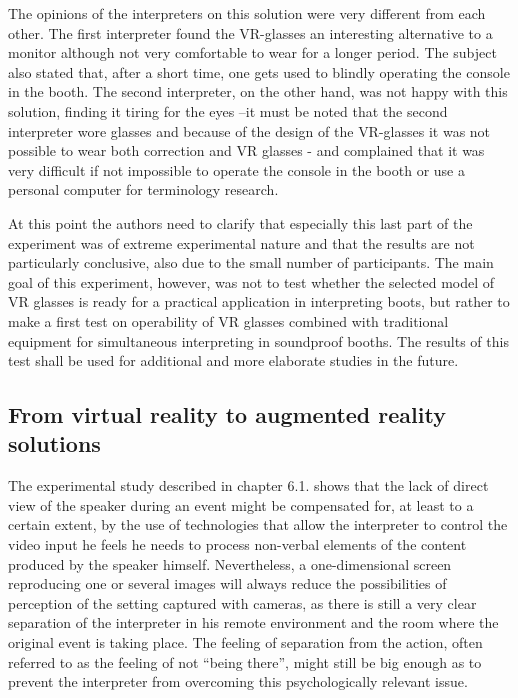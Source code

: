 \documentclass[output=paper]{langsci/langscibook}
\begin{document}
The opinions of the interpreters on this solution were very different from each other. The first interpreter found the \textsc{VR}-glasses an interesting alternative to a monitor although not very comfortable to wear for a longer period. The subject also stated that, after a short time, one gets used to blindly operating the console in the booth. The second interpreter, on the other hand, was not happy with this solution, finding it tiring for the eyes –it must be noted that the second interpreter wore glasses and because of the design of the \textsc{VR}-glasses it was not possible to wear both correction and \textsc{VR} glasses - and complained that it was very difficult if not impossible to operate the console in the booth or use a personal computer for terminology research.

At this point the authors need to clarify that especially this last part of the experiment was of extreme experimental nature and that the results are not particularly conclusive, also due to the small number of participants. The main goal of this experiment, however, was not to test whether the selected model of \textsc{VR} glasses is ready for a practical application in interpreting boots, but rather to make a first test on operability of \textsc{VR} glasses combined with traditional equipment for simultaneous interpreting in soundproof booths. The results of this test shall be used for additional and more elaborate studies in the future.

\subsection{From virtual reality to augmented reality solutions}

The experimental study described in chapter 6.1. shows that the lack of direct view of the speaker during an event might be compensated for, at least to a certain extent, by the use of technologies that allow the interpreter to control the video input he feels he needs to process non-verbal elements of the content produced by the speaker himself. Nevertheless, a one-dimensional screen reproducing one or several images will always reduce the possibilities of perception of the setting captured with cameras, as there is still a very clear separation of the interpreter in his remote environment and the room where the original event is taking place. The feeling of separation from the action, often referred to as the feeling of not “being there”, might still be big enough as to prevent the interpreter from overcoming this psychologically relevant issue. 
\end{document}
